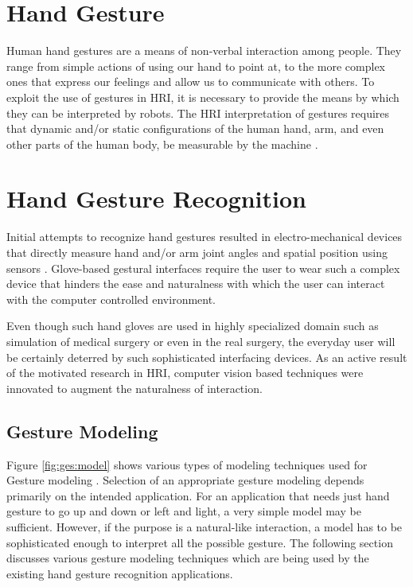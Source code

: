 \section{Hand Gesture} Human hand gestures are a means of non-verbal interaction among people. They range from simple actions of using our hand to point at, to the more complex ones that express our feelings and allow us to communicate with others. To exploit the use of gestures in HRI, it is necessary to provide the means by which they can be interpreted by robots. The HRI interpretation of gestures requires that dynamic and/or static configurations of the human hand, arm, and even other parts of the human body, be measurable by the machine \cite{6}. 

\section{Hand Gesture Recognition} Initial attempts to recognize hand gestures resulted in electro-mechanical devices that directly measure hand and/or arm joint angles and spatial position using sensors \cite{3}. Glove-based gestural interfaces require the user to wear such a complex device that hinders the ease and naturalness with which the user can interact with the computer controlled environment. 

Even though such hand gloves are used in highly specialized domain such as simulation of medical surgery or even in the real surgery, the everyday user will be certainly deterred by such sophisticated interfacing devices. As an active result of the motivated research in HRI, computer vision based techniques were innovated to augment the naturalness of interaction.

\subsection{Gesture Modeling} Figure \ref{fig:ges:model} shows various types of modeling techniques used for Gesture modeling \cite{3}. Selection of an appropriate gesture modeling depends primarily on the intended application. For an application that needs just hand gesture to go up and down or left and light, a very simple model may be sufficient. However, if the purpose is a natural-like interaction, a model has to be sophisticated enough to interpret all the possible gesture. The following section discusses various gesture modeling techniques which are being used by the existing hand gesture recognition applications. 

